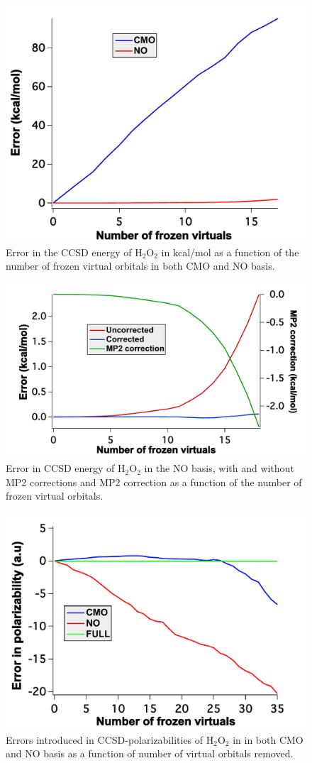 \begin{figure}
  \centering
  \includegraphics[width=0.6\linewidth]{figures/energy.pdf}
  \caption{\footnotesize{Error in the CCSD energy of H$_2$O$_2$ in kcal/mol as a 
           function of the number of frozen virtual orbitals in both CMO and NO basis.}} 
  \label{fig:energy}
\end{figure}
\begin{figure}
  \centering
  \includegraphics[width=0.6\linewidth]{figures/Mp2c.pdf}
  \caption{\footnotesize{Error in CCSD energy of H$_2$O$_2$ in the NO basis, with and without MP2 corrections 
        and MP2 correction as a function of the number of frozen virtual orbitals.}}
\label{fig:MP2_corr}
\end{figure}
\begin{figure}
  \centering
  \includegraphics[width=0.6\linewidth]{figures/h2o2_polar.pdf}
  \caption{\footnotesize{Errors introduced in CCSD-polarizabilities of H$_2$O$_2$ in 
       in both CMO and NO basis as a function of number of virtual orbitals removed.}}
   \label{fig:polar_h2o2}
\end{figure}
